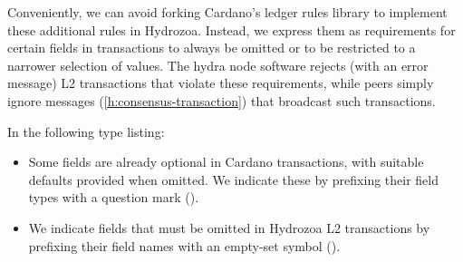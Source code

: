 \documentclass[../hydrozoa.tex]{subfiles}
\begin{document}
Conveniently, we can avoid forking Cardano's ledger rules library to implement these additional rules in Hydrozoa.
Instead, we express them as requirements for certain fields in transactions to always be omitted or to be restricted to a narrower selection of values.
The hydra node software rejects (with an error message) L2 transactions that violate these requirements, while peers simply ignore  messages (\cref{h:consensus-transaction}) that broadcast such transactions.

In the following type listing:
\begin{itemize}
  \item Some fields are already optional in Cardano transactions, with suitable defaults provided when omitted. We indicate these by prefixing their field types with a question mark ().
  \item We indicate fields that must be omitted in Hydrozoa L2 transactions by prefixing their field names with an empty-set symbol (\code{$\varnothing$}).
\end{itemize}
\begingroup
\allowdisplaybreaks
\end{document}
